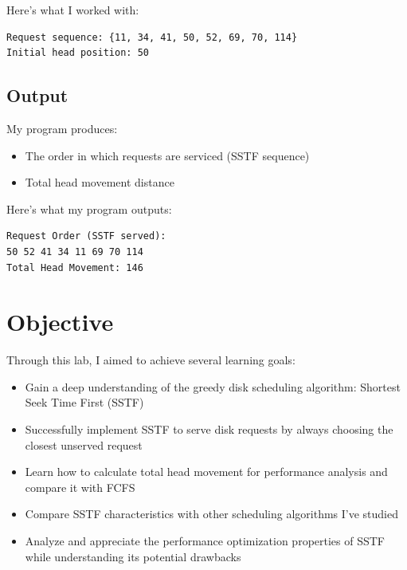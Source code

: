 \documentclass[12pt,a4paper]{article}
\begin{document}
Here's what I worked with:
\begin{verbatim}
Request sequence: {11, 34, 41, 50, 52, 69, 70, 114}
Initial head position: 50
\end{verbatim}

\subsection*{Output}
My program produces:
\begin{itemize}
  \item The order in which requests are serviced (SSTF sequence)
  \item Total head movement distance
\end{itemize}

Here's what my program outputs:
\begin{verbatim}
Request Order (SSTF served):
50 52 41 34 11 69 70 114
Total Head Movement: 146
\end{verbatim}

\section{Objective}
Through this lab, I aimed to achieve several learning goals:
\begin{itemize}
    \item Gain a deep understanding of the greedy disk scheduling algorithm: Shortest Seek Time First (SSTF)
    \item Successfully implement SSTF to serve disk requests by always choosing the closest unserved request
    \item Learn how to calculate total head movement for performance analysis and compare it with FCFS
    \item Compare SSTF characteristics with other scheduling algorithms I've studied
    \item Analyze and appreciate the performance optimization properties of SSTF while understanding its potential drawbacks
\end{itemize}
\end{document}
